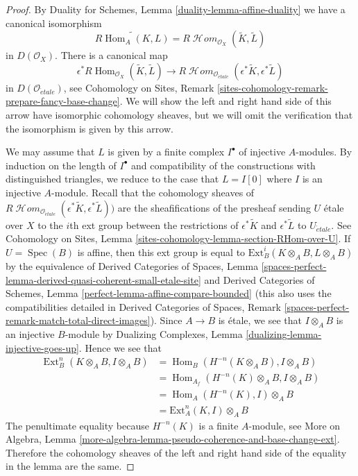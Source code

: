\documentclass{stacks-project}
\theoremstyle{plain}
\theoremstyle{definition}
\theoremstyle{remark}
\numberwithin{equation}{subsection}
\def\Spec{\mathop{\mathrm{Spec}}}
\def\Hom{\mathop{\mathrm{Hom}}\nolimits}
\def\Ext{\mathop{\mathrm{Ext}}\nolimits}
\def\SheafHom{\mathop{\mathcal{H}\!\mathit{om}}\nolimits}
\def\etale{{\acute{e}tale}}
\begin{document}
\begin{proof}
By Duality for Schemes, Lemma \ref{duality-lemma-affine-duality}
we have a canonical isomorphism
$$
\widetilde{R\Hom_A(K, L)} =
R\SheafHom_{\mathcal{O}_X}(\widetilde{K}, \widetilde{L})
$$
in $D(\mathcal{O}_X)$. There is a canonical map
$$
\epsilon^*R\Hom_{\mathcal{O}_X}(\widetilde{K}, \widetilde{L})
\longrightarrow
R\SheafHom_{\mathcal{O}_\etale}(\epsilon^*\widetilde{K},
\epsilon^*\widetilde{L})
$$
in $D(\mathcal{O}_\etale)$, see Cohomology on Sites, Remark
\ref{sites-cohomology-remark-prepare-fancy-base-change}.
We will show the left and right hand side of this arrow
have isomorphic cohomology sheaves, but we will omit the
verification that the isomorphism is given by this arrow.

\medskip\noindent
We may assume that $L$ is given by a finite complex $I^\bullet$
of injective $A$-modules. By induction on the length of $I^\bullet$
and compatibility of the constructions with distinguished triangles,
we reduce to the case that $L = I[0]$ where $I$ is an injective $A$-module.
Recall that the cohomology sheaves of
$R\SheafHom_{\mathcal{O}_\etale}(\epsilon^*\widetilde{K},
\epsilon^*\widetilde{L}))$
are the sheafifications of the presheaf sending $U$ \'etale
over $X$ to the $i$th ext group between the restrictions of
$\epsilon^*\widetilde{K}$ and $\epsilon^*\widetilde{L}$
to $U_\etale$. See
Cohomology on Sites, Lemma
\ref{sites-cohomology-lemma-section-RHom-over-U}.
If $U = \Spec(B)$ is affine, then this ext group
is equal to $\text{Ext}^i_B(K \otimes_A B, L \otimes_A B)$
by the equivalence of
Derived Categories of Spaces, Lemma
\ref{spaces-perfect-lemma-derived-quasi-coherent-small-etale-site} and
Derived Categories of Schemes, Lemma
\ref{perfect-lemma-affine-compare-bounded}
(this also uses the compatibilities detailed in
Derived Categories of Spaces, Remark
\ref{spaces-perfect-remark-match-total-direct-images}).
Since $A \to B$ is \'etale, we see that
$I \otimes_A B$ is an injective $B$-module
by Dualizing Complexes, Lemma \ref{dualizing-lemma-injective-goes-up}.
Hence we see that
\begin{align*}
\Ext^n_B(K \otimes_A B, I \otimes_A B)
& =
\Hom_B(H^{-n}(K \otimes_A B), I \otimes_A B) \\
& =
\Hom_{A_f}(H^{-n}(K) \otimes_A B, I \otimes_A B) \\
& =
\Hom_A(H^{-n}(K), I) \otimes_A B \\
& =
\text{Ext}^n_A(K, I) \otimes_A B
\end{align*}
The penultimate equality because $H^{-n}(K)$ is a finite $A$-module, see
More on Algebra, Lemma
\ref{more-algebra-lemma-pseudo-coherence-and-base-change-ext}.
Therefore the cohomology sheaves of the left and right hand
side of the equality in the lemma are the same.
\end{proof}
\end{document}
